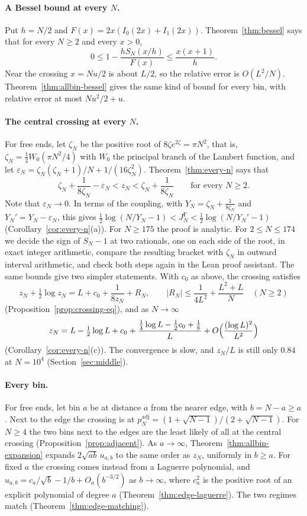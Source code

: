 \documentclass[11pt]{article}
\theoremstyle{definition}
\theoremstyle{remark}
\begin{document}
\paragraph{A Bessel bound at every $N$.} Put $h=N/2$ and
$F(x)=2x(I_0(2x)+I_1(2x))$. Theorem~\ref{thm:bessel} says that for every
$N\ge2$ and every $x>0$,
\[
0\le1-\frac{hS_N(x/h)}{F(x)}\le\frac{x(x+1)}h .
\]
Near the crossing $x=Nu/2$ is about $L/2$, so the relative error is
$O(L^2/N)$. Theorem~\ref{thm:allbin-bessel} gives the
same kind of bound for every bin, with relative error at most $Nu^2/2+u$.

\paragraph{The central crossing at every $N$.} For free ends, let $\zeta_N$ be the positive
root of $8\zeta e^{2\zeta}=\pi N^2$, that is, $\zeta_N=\frac12W_0(\pi N^2/4)$
with $W_0$ the principal branch of the Lambert function, and let
$\varepsilon_N=\zeta_N(\zeta_N+1)/N+1/(16\zeta_N^2)$. Theorem~\ref{thm:every-n}
says that
\[
\zeta_N+\frac1{8\zeta_N}-\varepsilon_N<z_N<\zeta_N+\frac1{8\zeta_N}
\qquad\text{for every }N\ge2.
\]
Note that $\varepsilon_N\to0$. In terms of the coupling, with
$Y_N=\zeta_N+\frac1{8\zeta_N}$ and $Y_N'=Y_N-\varepsilon_N$, this gives
$\frac12\log(N/Y_N-1)<J_N^{\mathrm F}<\frac12\log(N/Y_N'-1)$
(Corollary~\ref{cor:every-n}(a)). For $N\ge175$ the proof is analytic. For
$2\le N\le174$ we decide the sign of $S_N-1$ at two rationals, one on each side
of the root, in exact integer arithmetic, compare the resulting bracket with
$\zeta_N$ in outward interval arithmetic, and check both steps again in the
Lean proof assistant. The same bounds give two simpler statements. With $c_0$ as above, the
crossing satisfies
\[
z_N+\tfrac12\log z_N=L+c_0+\frac1{8z_N}+R_N,\qquad
|R_N|\le\frac1{4L^2}+\frac{L^2+L}N\quad(N\ge2)
\]
(Proposition~\ref{prop:crossing-eq}), and as $N\to\infty$
\[
z_N=L-\tfrac12\log L+c_0+\frac{\frac14\log L-\frac12c_0+\frac18}{L}
+O\Bigl(\frac{(\log L)^2}{L^2}\Bigr)
\]
(Corollary~\ref{cor:every-n}(c)). The convergence is slow, and $z_N/L$ is still
only $0.84$ at $N=10^4$ (Section~\ref{sec:middle}).

\paragraph{Every bin.} For free ends, let bin $a$ be at distance $a$ from the nearer edge,
with $b=N-a\ge a$. Next to the edge the crossing is at
$p_N^{\mathrm{adj}}=(1+\sqrt{N-1})/(2+\sqrt{N-1})$. For $N\ge4$ the two bins
next to the edges are the least likely of all at the central crossing
(Proposition~\ref{prop:adjacent}). As $a\to\infty$,
Theorem~\ref{thm:allbin-expansion} expands $2\sqrt{ab}\,u_{a,b}$ to the same
order as $z_N$, uniformly in $b\ge a$. For fixed $a$ the crossing comes
instead from a Laguerre polynomial, and $u_{a,b}=c_a/\sqrt b-1/b+O_a(b^{-3/2})$ as $b\to\infty$,
where $c_a^2$ is the positive root of an explicit polynomial of degree $a$
(Theorem~\ref{thm:edge-laguerre}). The two regimes match
(Theorem~\ref{thm:edge-matching}).
\end{document}
